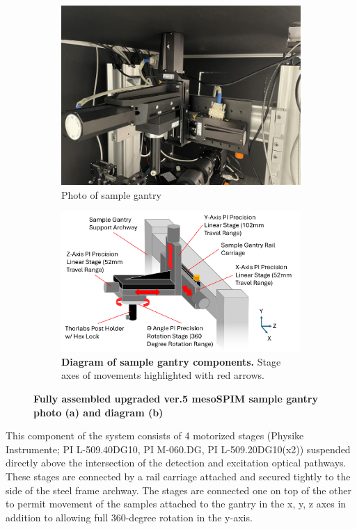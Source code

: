 \begin{figure}[H]
    \centering
    \begin{subfigure}[a]{1\textwidth}
    \includegraphics[width=0.875\linewidth]{Images/GantryPhoto.jpg}
    \caption{Photo of sample gantry}
    \end{subfigure}
    \medskip
    \begin{subfigure}[b]{1\textwidth}
    \includegraphics[width=0.875\linewidth]{Figures/Gantry Diagram.png}
    \caption{\textbf{Diagram of sample gantry components.} Stage axes of movements highlighted with red arrows.}
    \end{subfigure}
   
   
    \caption{\textbf{Fully assembled upgraded ver.5 mesoSPIM sample gantry photo (a) and diagram (b)}}
\end{figure}

This component of the system consists of 4 motorized stages (Physike Instrumente; PI L-509.40DG10, PI M-060.DG, PI L-509.20DG10(x2)) suspended directly above the intersection of the detection and excitation optical pathways. These stages are connected by a rail carriage attached and secured tightly to the side of the steel frame archway. The stages are connected one on top of the other to permit movement of the samples attached to the gantry in the x, y, z axes in addition to allowing full 360-degree rotation in the y-axis. 


